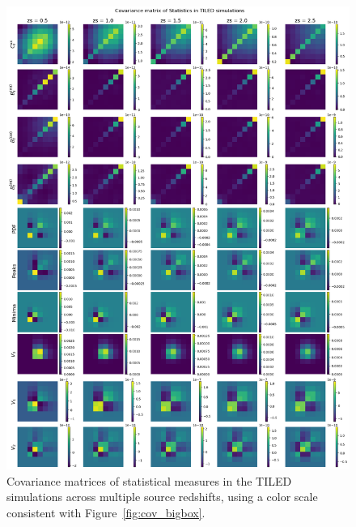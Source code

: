 \begin{figure}[p]
    \centering
    \includegraphics[width=\textwidth]{figures/results/cov_tiled.png}
    \caption[Covariance Matrices of Statistical Measures in TILED Simulations]{Covariance matrices of statistical measures in the TILED simulations across multiple source redshifts, using a color scale consistent with Figure~\ref{fig:cov_bigbox}.}
    \label{fig:cov_tiled}
\end{figure}

